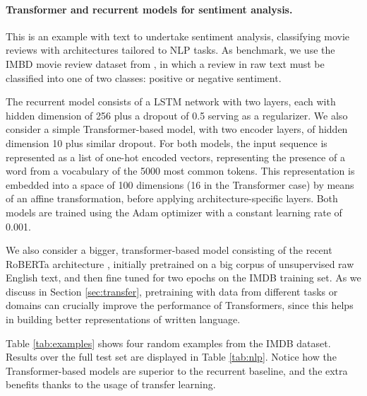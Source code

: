 \paragraph{Transformer and recurrent models for sentiment analysis.}
This is an example with text to undertake sentiment analysis, classifying movie reviews with architectures tailored to NLP tasks. As benchmark, we use the IMBD movie review dataset 
from \parencite{maas-EtAl:2011:ACL-HLT2011}, in which a review in raw text must be classified into one of two classes: positive or negative
sentiment. 

The recurrent model consists of a LSTM network with two layers, each with hidden dimension of 256 plus a dropout of 0.5 serving as a regularizer. We also consider a simple Transformer-based model, with two encoder layers, of hidden dimension 10 plus similar dropout. For both models, the input sequence is represented as a list of one-hot encoded vectors, representing the presence of a word from a vocabulary of the 5000 most common tokens. This representation is embedded into a space of 100 dimensions
(16 in the Transformer case) by means of an affine transformation, before applying architecture-specific layers. Both models are trained using the Adam optimizer with a constant learning rate of 0.001.

We also consider a bigger, transformer-based model consisting of the recent RoBERTa architecture \parencite{liu2019roberta}, 
initially pretrained on a big corpus of unsupervised raw  English text, and then fine tuned for two epochs on the IMDB training set. As we 
 discuss in Section \ref{sec:transfer}, pretraining with data from different tasks or domains can crucially improve the performance of Transformers, since this helps in building better representations of written language.

Table \ref{tab:examples} shows four random examples from the IMDB dataset.
Results over the full test set are displayed in Table \ref{tab:nlp}. Notice how the Transformer-based models are superior to the recurrent baseline, and the extra benefits thanks to the usage of transfer learning.


